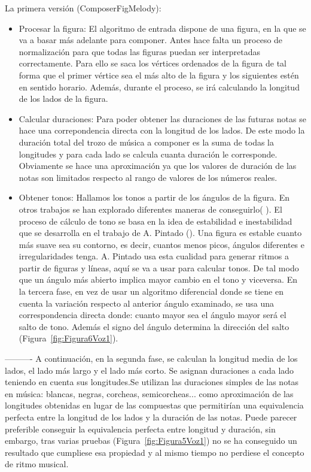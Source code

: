 La primera versión (ComposerFigMelody):
\begin{itemize}
	\item Procesar la figura: El algoritmo de entrada dispone de una figura, en la que se va a basar más adelante para componer. Antes hace falta un proceso de normalización para que todas las figuras puedan ser interpretadas correctamente. Para ello se saca los vértices ordenados de la figura de tal forma que el primer vértice sea el más alto de la figura y los siguientes estén en sentido horario. Además, durante el proceso, se irá calculando la longitud de los lados de la figura.

	\item Calcular duraciones: Para poder obtener las duraciones de las futuras notas se hace una correpondencia directa con la longitud de los lados. De este modo la duración total del trozo de música a componer es la suma de todas la longitudes y para cada lado se calcula cuanta duración le corresponde. Obviamente se hace una aproximación ya que los valores de duración de las notas son limitados respecto al rango de valores de los números reales.

	\item Obtener tonos: Hallamos los tonos a partir de los ángulos de la figura. En otros trabajos se han explorado diferentes maneras de conseguirlo(\cite{bricksConvertsMusic} \cite{ImageBaseComposition}). El proceso de cálculo de tono se basa en la idea de estabilidad e inestabilidad que se desarrolla en el trabajo de A. Pintado (\cite{portutesis}). Una figura es estable cuanto más suave sea su contorno, es decir, cuantos menos picos, ángulos diferentes e irregularidades tenga. A. Pintado usa esta cualidad para generar ritmos a partir de figuras y líneas, aquí se va a usar para calcular tonos. De tal modo que un ángulo más abierto implica mayor cambio en el tono y viceversa.
En la tercera fase, en vez de usar un algoritmo diferencial donde se tiene en cuenta la variación respecto al anterior ángulo examinado, se usa una correspondencia directa donde: cuanto mayor sea el ángulo mayor será el salto de tono. Además el signo del ángulo determina la dirección del salto (Figura~\ref{fig:Figura6Voz1}).

\end{itemize}
----------
A continuación, en la segunda fase, se calculan la longitud media de los lados, el lado más largo y el lado más corto. Se asignan duraciones a cada lado teniendo en cuenta sus longitudes.Se utilizan las duraciones simples de las notas en música: blancas, negras, corcheas, semicorcheas... como aproximación de las longitudes obtenidas en lugar de las compuestas que permitirían una equivalencia perfecta entre la longitud de los lados y la duración de las notas. Puede parecer preferible conseguir la equivalencia perfecta entre longitud y duración, sin embargo, tras varias pruebas  (Figura~\ref{fig:Figura5Voz1}) no se ha conseguido un resultado que cumpliese esa propiedad y al mismo tiempo no perdiese el concepto de ritmo musical.\\

